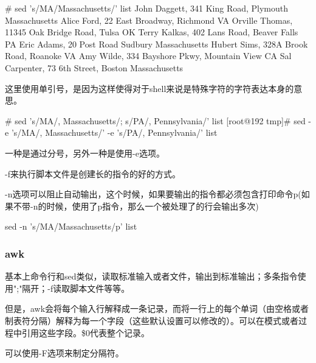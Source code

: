 \begin{Command-Line}# sed 's/MA/Massachusetts/' list
John Daggett, 341 King Road, Plymouth Massachusetts
Alice Ford, 22 East Broadway, Richmond VA
Orville Thomas, 11345 Oak Bridge Road, Tulsa OK
Terry Kalkas, 402 Lans Road, Beaver Falls PA
Eric Adams, 20 Post Road Sudbury Massachusetts
Hubert Sims, 328A Brook Road, Roanoke VA
Amy Wilde, 334 Bayshore Pkwy, Mountain View CA
Sal Carpenter, 73 6th Street, Boston Massachusetts
\end{Command-Line}

这里使用单引号，是因为这样使得对于shell来说是特殊字符的字符表达本身的意思。

\begin{Command-Line}# sed 's/MA/, Massachusetts/; s/PA/, Pennsylvania/' list
[root@192 tmp]# sed -e 's/MA/, Massachusetts/' -e 's/PA/, Pennsylvania/' list
\end{Command-Line}

一种是通过分号，另外一种是使用-e选项。

-f来执行脚本文件是创建长的指令的好的方式。

-n选项可以阻止自动输出，这个时候，如果要输出的指令都必须包含打印命令p(如果不带-n的时候，使用了p指令，那么一个被处理了的行会输出多次)

\begin{Command-Line}
sed -n 's/MA/Massachusetts/p' list
\end{Command-Line}

\subsubsection{awk}

基本上命令行和sed类似，读取标准输入或者文件，输出到标准输出；多条指令使用";"隔开；-f读取脚本文件等等。

但是，awk会将每个输入行解释成一条记录，而将一行上的每个单词（由空格或者制表符分隔）解释为每一个字段（这些默认设置可以修改的）。可以在模式或者过程中引用这些字段。\$0代表整个记录。


可以使用-F选项来制定分隔符。

